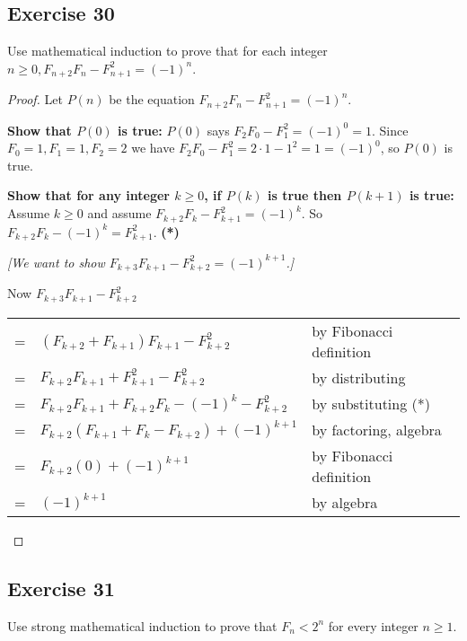 \documentclass[14pt]{extarticle}
\newcommand{\cy}{\color{cyan}}
\begin{document}
\subsection{Exercise 30}
Use mathematical induction to prove that for each integer $n \geq 0, F_{n + 2}F_n - F_{n+1}^2 = (-1)^n$.

\begin{proof}
    Let $P(n)$ be the equation \(F_{n + 2}F_n - F_{n+1}^2 = (-1)^n\).

        {\bf Show that \(P(0)\) is true:} \(P(0)\) says \(F_2 F_0 - F_1^2 = (-1)^0 = 1\). Since $F_0 = 1, F_1 = 1, F_2 = 2$ we
    have \(F_2 F_0 - F_1^2 = 2 \cdot 1 - 1^2 = 1 = (-1)^0\), so \(P(0)\) is true.

        {\bf Show that for any integer \(k \geq 0\), if $P(k)$ is true then \(P(k+1)\) is true:} Assume \(k \geq 0\) and
    assume \(F_{k + 2}F_k - F_{k+1}^2 = (-1)^k\). So \(F_{k + 2}F_k - (-1)^k = F_{k+1}^2\). {\bf (*)}

    {\it [We want to show \(F_{k + 3}F_{k+1} - F_{k+2}^2 = (-1)^{k+1}\).]}

    Now $F_{k + 3}F_{k+1} - F_{k+2}^2$

    \begin{tabular}{cll}
        = & $(F_{k + 2} + F_{k + 1})F_{k+1} - F_{k+2}^2$             & {\cy by Fibonacci definition} \\
        = & $F_{k + 2}F_{k + 1} + F_{k+1}^2 - F_{k+2}^2$             & {\cy by distributing}         \\
        = & $F_{k + 2}F_{k + 1} + F_{k + 2}F_k - (-1)^k - F_{k+2}^2$ & {\cy by substituting (*)}     \\
        = & $F_{k + 2}(F_{k + 1} + F_k - F_{k+2}) + (-1)^{k+1}$      & {\cy by factoring, algebra}   \\
        = & $F_{k + 2}(0) + (-1)^{k+1}$                              & {\cy by Fibonacci definition} \\
        = & $(-1)^{k+1}$                                             & {\cy by algebra}
    \end{tabular}
\end{proof}

\subsection{Exercise 31}
Use strong mathematical induction to prove that $F_n < 2^n$ for every integer $n \geq 1$.
\end{document}
